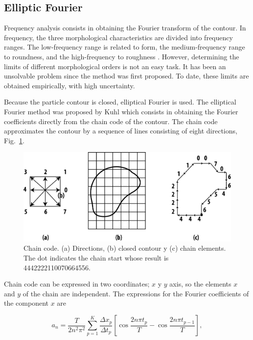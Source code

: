 \documentclass[conference]{IEEEtran}
\begin{document}
\subsection{Elliptic Fourier}

Frequency analysis consists in obtaining the Fourier transform of the contour. In frequency, the three morphological characteristics are divided into frequency ranges. The low-frequency range is related to form, the medium-frequency range to roundness, and the high-frequency to roughness \cite{b8}. However, determining the limits of different morphological orders is not an easy task. It has been an unsolvable problem since the method was first proposed. To date, these limits are obtained empirically, with high uncertainty.


Because the particle contour is closed, elliptical Fourier is used. The elliptical Fourier method was proposed by Kuhl \cite{b9} which consists in obtaining the Fourier coefficients directly from the chain code of the contour. The chain code approximates the contour by a sequence of lines consisting of eight directions, Fig.~\ref{fig3}.

\begin{figure}[htbp]
\centerline{\includegraphics[scale=0.6]{fig3.png}}
\caption{Chain code. (a) Directions, (b) closed contour y (c)  chain elements. The dot indicates the chain start whose result is 4442222110070664556.}
\label{fig3}
\end{figure}

Chain code can be expressed in two coordinates; $x$ y $y$ axis, so the elements $x$ and $y$ of the chain are independent.  The expressions for the Fourier coefficients of the component \(x\) are

\begin{equation}
a_n = \frac{T}{2n^2\pi^2}\sum_{p = 1}^{K}\frac{\Delta x_p}{\Delta t_p}[\cos{\frac{2n\pi t_p}{T}} - \cos{\frac{2n\pi t_{p-1}}{T}}], \label{eq2}
\end{equation}
\end{document}
